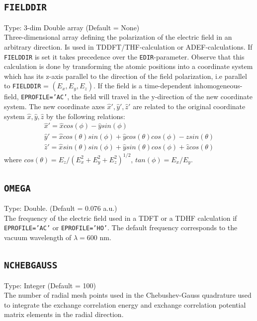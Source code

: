 \documentclass[a4paper,twoside,openany]{book}
\begin{document}
\subsection{\texttt{FIELDDIR}}
Type: 3-dim Double array (Default = None)\\
Three-dimensional array defining the polarization of the electric field in an arbitrary direction. Is used in  TDDFT/THF-calculation or ADEF-calculations. If  \texttt{FIELDDIR} is set  it takes precedence over the \texttt{EDIR}-parameter. Observe that this calculation is done by transforming the atomic positions 
into a coordinate system which has its z-axis parallel to the direction of the field polarization, i.e parallel to \texttt{FIELDDIR} = $(E_{x}, E_{y}, E_{z})$. If the field is a time-dependent inhomogeneous-field, \texttt{EPROFILE='AC'}, the field will travel in the y-direction of the new coordinate system. The new coordinate axes $\hat{x}',\hat{y}',\hat{z}'$ are related to the original coordinate system $\hat{x},\hat{y},\hat{z}$ by the following relations:
\begin{eqnarray}
\hat{x}' =  \hat{x}cos(\phi) - \hat{y}sin(\phi) \qquad \qquad \qquad \qquad \quad \quad\nonumber \\
\hat{y}' = \hat{x}cos(\theta)sin(\phi) + \hat{y}cos(\theta)cos(\phi) - \hat{z}sin(\theta)  \nonumber \\
\hat{z}' = \hat{x}sin(\theta)sin(\phi) + \hat{y}sin(\theta)cos(\phi) + \hat{z}cos(\theta)
\end{eqnarray}
where $cos(\theta) = E_{z}/(E_{x}^2+E_{y}^2+E_{z}^2)^{1/2}$, $tan(\phi) = E_{x}/E_{y}$.

  \subsection{\texttt{OMEGA}}
 Type: Double. (Default = 0.076 a.u.)\\
 The frequency of the electric field used in a TDFT or a TDHF calculation if  \texttt{EPROFILE='AC'} or \texttt{EPROFILE='HO'}. The default frequency corresponds to the vacuum wavelength of $\lambda= 600$ nm.
  
 \subsection{\texttt{NCHEBGAUSS}}
 Type: Integer (Default = 100)\\
 The number of radial mesh points used in the Chebushev-Gauss quadrature used to integrate  the exchange correlation energy and exchange correlation potential matrix elements in the radial direction.
 
\end{document}
